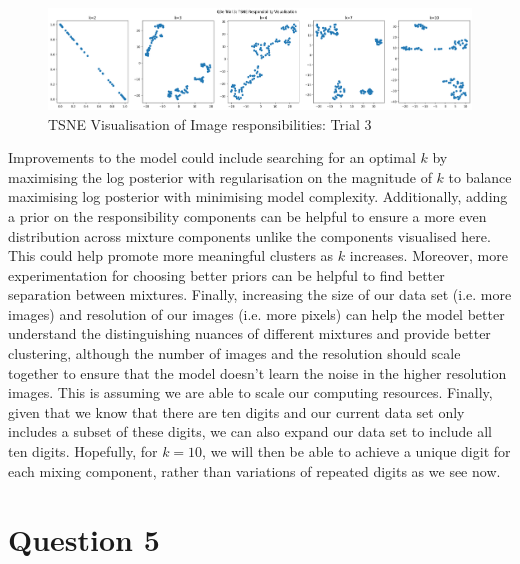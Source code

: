 \documentclass[12pt]{article}
\begin{document}
\begin{enumerate}
\begin{figure}[h]
  \centering
  \includegraphics[scale=0.35]{outputs/q3/q3e-3-tsne}
  \caption{TSNE Visualisation of Image responsibilities: Trial 3}
  \label{fig:3e-tsne-3}
\end{figure}

Improvements to the model could include searching for an optimal $k$ by maximising the log posterior with regularisation on the magnitude of $k$ to balance maximising log posterior with minimising model complexity. Additionally, adding a prior on the responsibility components can be helpful to ensure a more even distribution across mixture components unlike the components visualised here. This could help promote more meaningful clusters as $k$ increases.  Moreover, more experimentation for choosing better priors can be helpful to find better separation between mixtures. Finally, increasing the size of our data set (i.e. more images) and resolution of our images (i.e. more pixels) can help the model better understand the distinguishing nuances of different mixtures and provide better clustering, although the number of images and the resolution should scale together to ensure that the model doesn't learn the noise in the higher resolution images. This is assuming we are able to scale our computing resources. Finally, given that we know that there are ten digits and our current data set only includes a subset of these digits, we can also expand our data set to include all ten digits. Hopefully, for $k=10$, we will then be able to achieve a unique digit for each mixing component, rather than variations of repeated digits as we see now.

\end{enumerate}



\newpage
\section*{Question 5}
\end{document}
